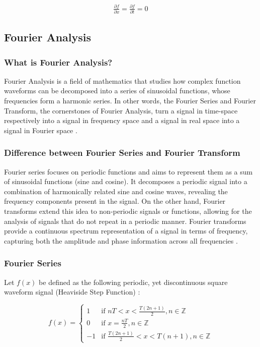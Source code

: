\begin{align}
    \frac{\partial f}{\partial x} = \frac{\partial f}{\partial t} = 0 \label{eq:trivial_pde}
\end{align}


\subsection{Fourier Analysis}
\subsubsection{What is Fourier Analysis?}
Fourier Analysis is a field of mathematics that studies how complex function waveforms can be decomposed into a series of sinusoidal functions, whose frequencies form a harmonic series. In other words, the Fourier Series and Fourier Transform, the cornerstones of Fourier Analysis, turn a signal in time-space respectively into a signal in frequency space and a signal in real space into a signal in Fourier space \citep{stein2011fourier}.

\subsubsection{Difference between Fourier Series and Fourier Transform}
 Fourier series focuses on periodic functions and aims to represent them as a sum of sinusoidal functions (sine and cosine). It decomposes a periodic signal into a combination of harmonically related sine and cosine waves, revealing the frequency components present in the signal. On the other hand, Fourier transforms extend this idea to non-periodic signals or functions, allowing for the analysis of signals that do not repeat in a periodic manner. Fourier transforms provide a continuous spectrum representation of a signal in terms of frequency, capturing both the amplitude and phase information across all frequencies \citep{Tutorialspoint_2022}.

\subsubsection{Fourier Series}
\noindent
Let \(f(x)\) be defined as the following periodic, yet discontinuous square waveform signal (Heaviside Step Function) \citep{Mathworld_2023b}:

\begin{equation} \label{eq:heaviside_step}
f(x)=
    \begin{cases}
        1 & \text{if } nT < x < \frac{T(2n+1)}{2} , n \in \mathbb{Z}\\
        0 & \text{if } x = \frac{nT}{2} , n \in \mathbb{Z}\\
        -1 & \text{if } \frac{T(2n+1)}{2} < x < T(n+1) , n \in \mathbb{Z}
    \end{cases}
\end{equation}

